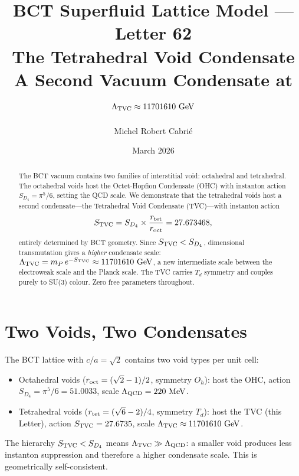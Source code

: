 \documentclass[aps,prl,preprint,superscriptaddress,floatfix]{revtex4-2}
\begin{document}
\title{BCT Superfluid Lattice Model --- Letter 62\\
The Tetrahedral Void Condensate\\
A Second Vacuum Condensate at $\Lambda_{\rm TVC} \approx 11701610~\text{GeV}$}

\author{Michel Robert Cabri\'e}
\date{March 2026}

\begin{abstract}
The BCT vacuum contains two families of interstitial void: octahedral and tetrahedral.
The octahedral voids host the Octet-Hopfion Condensate (OHC) with instanton action
$S_{D_4}=\pi^5/6$, setting the QCD scale. We demonstrate that the tetrahedral voids
host a second condensate---the Tetrahedral Void Condensate (TVC)---with instanton action
\begin{equation*}
S_{\rm TVC} = S_{D_4}\times\frac{r_{\rm tet}}{r_{\rm oct}} = 27.673468,
\end{equation*}
entirely determined by BCT geometry. Since $S_{\rm TVC}<S_{D_4}$, dimensional
transmutation gives a \emph{higher} condensate scale:
$\Lambda_{\rm TVC}=m_P\,e^{-S_{\rm TVC}}\approx11701610~\text{GeV}$,
a new intermediate scale between the electroweak scale and the Planck scale.
The TVC carries $T_d$ symmetry and couples purely to SU(3) colour.
Zero free parameters throughout.
\end{abstract}

\maketitle
\tableofcontents

\section{Two Voids, Two Condensates}

The BCT lattice with $c/a=\sqrt{2}$ contains two void types per unit cell:
\begin{itemize}
\item Octahedral voids ($r_{\rm oct}=(\sqrt{2}-1)/2$, symmetry $O_h$): host the OHC,
action $S_{D_4}=\pi^5/6=51.0033$, scale $\Lambda_{\rm QCD}=220~\text{MeV}$.
\item Tetrahedral voids ($r_{\rm tet}=(\sqrt{6}-2)/4$, symmetry $T_d$): host the TVC
(this Letter), action $S_{\rm TVC}=27.6735$, scale
$\Lambda_{\rm TVC}\approx11701610~\text{GeV}$.
\end{itemize}
The hierarchy $S_{\rm TVC}<S_{D_4}$ means $\Lambda_{\rm TVC}\gg\Lambda_{\rm QCD}$:
a smaller void produces less instanton suppression and therefore a higher condensate
scale. This is geometrically self-consistent.
\end{document}
